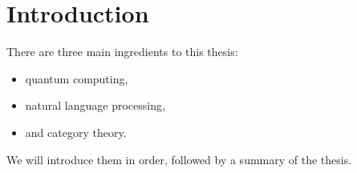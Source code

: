 
\chapter*{Introduction}

There are three main ingredients to this thesis:

\begin{itemize}
\item quantum computing,
\item natural language processing,
\item and category theory.
\end{itemize}

We will introduce them in order, followed by a summary of the thesis.

% 

%
%
%
%
%
